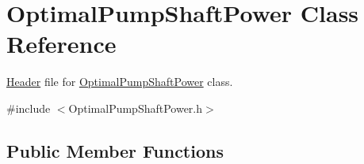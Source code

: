 \hypertarget{class_optimal_pump_shaft_power}{}\section{Optimal\+Pump\+Shaft\+Power Class Reference}
\label{class_optimal_pump_shaft_power}


\hyperlink{class_header}{Header} file for \hyperlink{class_optimal_pump_shaft_power}{Optimal\+Pump\+Shaft\+Power} class.  




{\ttfamily \#include $<$Optimal\+Pump\+Shaft\+Power.\+h$>$}

\subsection*{Public Member Functions}
